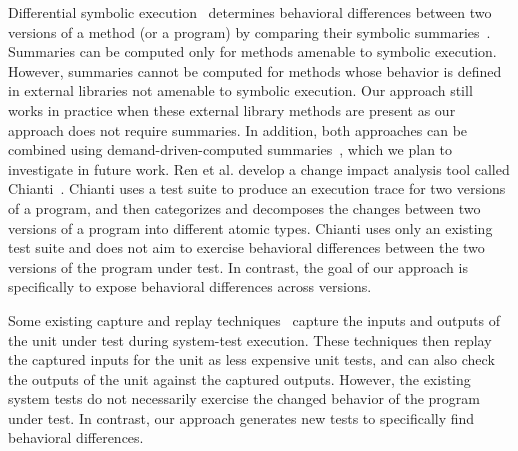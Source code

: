 Differential symbolic execution~\cite{DSE} determines behavioral differences between two versions of a method (or a program) by comparing their symbolic summaries~\cite{CSE}. Summaries can be computed only for methods amenable to symbolic execution. However, summaries cannot be computed for methods whose behavior is defined in external libraries not amenable to symbolic execution. Our approach still works in practice when these external library methods are present as our approach does not require summaries. In addition, both approaches can be combined using demand-driven-computed summaries~\cite{demandDriven}, which we plan to investigate in future work.
Ren et al. develop a change impact analysis tool called Chianti~\cite{chianti}. Chianti uses a test suite to produce an execution trace for two versions of a program, and then
categorizes and decomposes the changes between two versions of a program into different atomic types. Chianti uses only an existing test suite and
does not aim to exercise behavioral differences between the two
versions of the program under test. In contrast, the goal of
our approach is specifically to expose behavioral differences across
versions.

Some existing capture and replay techniques~\cite{elbaum, orso:selective, SaffAPE2005} capture
the inputs and outputs of the unit under test during system-test execution. 
These techniques then replay the captured inputs for the
unit as less expensive unit tests, and can also check the outputs of
the unit against the captured outputs. However, the existing system tests do not necessarily exercise the changed behavior of the program under test. In contrast, our approach generates new tests to specifically find behavioral differences.


